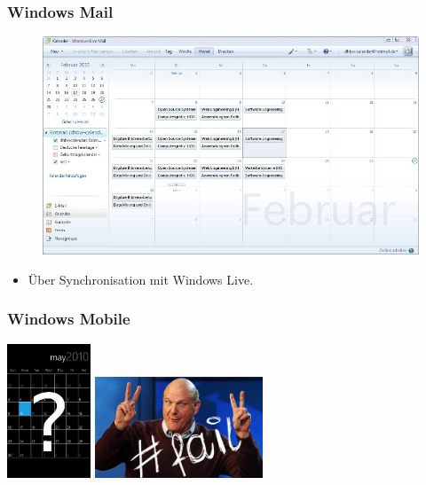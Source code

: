 \documentclass{beamer}
\begin{document}
\begin{frame}\frametitle{Windows Mail}
  \begin{figure}
    \centering
    \includegraphics[height=0.6\paperheight]{images/dhbwcalendar-live-desktop.jpg}
  \end{figure}
  \begin{itemize}
    \item Über Synchronisation mit Windows Live.
  \end{itemize}
\end{frame}

\begin{frame}\frametitle{Windows Mobile}
  \vspace{1cm}
    \begin{center}
      \includegraphics[height=4cm]{images/dhbwcalendar-windows-phone.jpg}
      \hspace{1cm}
      \includegraphics[height=3cm]{images/ballmer.jpg}
    \end{center}
\end{frame}
\end{document}
